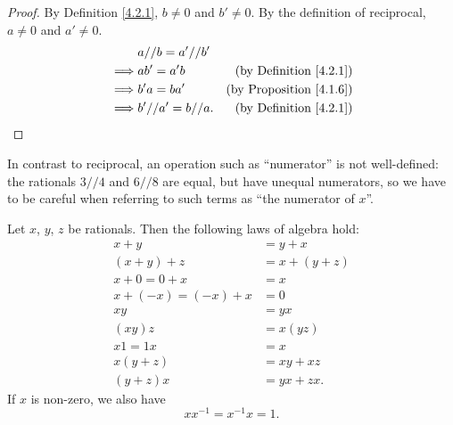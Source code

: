 \begin{proof}
    By Definition \ref{4.2.1}, \(b \neq 0\) and \(b' \neq 0\).
    By the definition of reciprocal, \(a \neq 0\) and \(a' \neq 0\).
    \begin{align*}
                 & a // b = a' // b'                                        \\
        \implies & ab' = a'b          & \text{(by Definition \ref{4.2.1})}  \\
        \implies & b'a = ba'          & \text{(by Proposition \ref{4.1.6})} \\
        \implies & b' // a' = b // a. & \text{(by Definition \ref{4.2.1})}
    \end{align*}
\end{proof}

\begin{note}
    In contrast to reciprocal, an operation such as ``numerator'' is not well-defined:
    the rationals \(3 // 4\) and \(6 // 8\) are equal, but have unequal numerators, so we have to be careful when referring to such terms as ``the numerator of \(x\)''.
\end{note}

\begin{proposition}\label{4.2.4}
    Let \(x\), \(y\), \(z\) be rationals.
    Then the following laws of algebra hold:
    \begin{align*}
        x + y               & = y + x       \\
        (x + y) + z         & = x + (y + z) \\
        x + 0 = 0 + x       & = x           \\
        x + (-x) = (-x) + x & = 0           \\
        xy                  & = yx          \\
        (xy)z               & = x(yz)       \\
        x1 = 1x             & = x           \\
        x(y + z)            & = xy + xz     \\
        (y + z)x            & = yx + zx.
    \end{align*}
    If \(x\) is non-zero, we also have
    \[
        xx^{-1} = x^{-1}x = 1.
    \]
\end{proposition}


